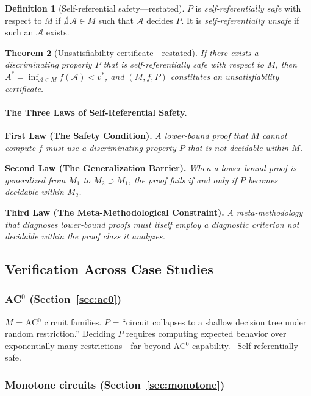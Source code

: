 \documentclass[11pt,a4paper]{article}
\theoremstyle{plain}
\newtheorem{theorem}{Theorem}[section]
\theoremstyle{definition}
\newtheorem{definition}[theorem]{Definition}
\theoremstyle{remark}
\begin{document}
\begin{definition}[Self-referential safety---restated]
\label{def:srs-unified}
$P$ is \emph{self-referentially safe} with respect to $M$ if $\nexists\, \mathcal{A} \in M$ such that $\mathcal{A}$ decides $P$. It is \emph{self-referentially unsafe} if such an $\mathcal{A}$ exists.
\end{definition}

\begin{theorem}[Unsatisfiability certificate---restated]
If there exists a discriminating property $P$ that is self-referentially safe with respect to $M$, then $A^* = \inf_{\mathcal{A} \in M} f(\mathcal{A}) < v^*$, and $(M, f, P)$ constitutes an unsatisfiability certificate.
\end{theorem}

\paragraph{The Three Laws of Self-Referential Safety.}

\textbf{First Law (The Safety Condition).} \emph{A lower-bound proof that $M$ cannot compute $f$ must use a discriminating property $P$ that is not decidable within $M$.}

\textbf{Second Law (The Generalization Barrier).} \emph{When a lower-bound proof is generalized from $M_1$ to $M_2 \supset M_1$, the proof fails if and only if $P$ becomes decidable within $M_2$.}

\textbf{Third Law (The Meta-Methodological Constraint).} \emph{A meta-methodology that diagnoses lower-bound proofs must itself employ a diagnostic criterion not decidable within the proof class it analyzes.}

\subsection{Verification Across Case Studies}

\subsubsection{AC$^0$ (Section~\ref{sec:ac0})}

$M$ = AC$^0$ circuit families. $P$ = ``circuit collapses to a shallow decision tree under random restriction.'' Deciding $P$ requires computing expected behavior over exponentially many restrictions---far beyond AC$^0$ capability. \checkmark\ Self-referentially safe.

\subsubsection{Monotone circuits (Section~\ref{sec:monotone})}
\end{document}
